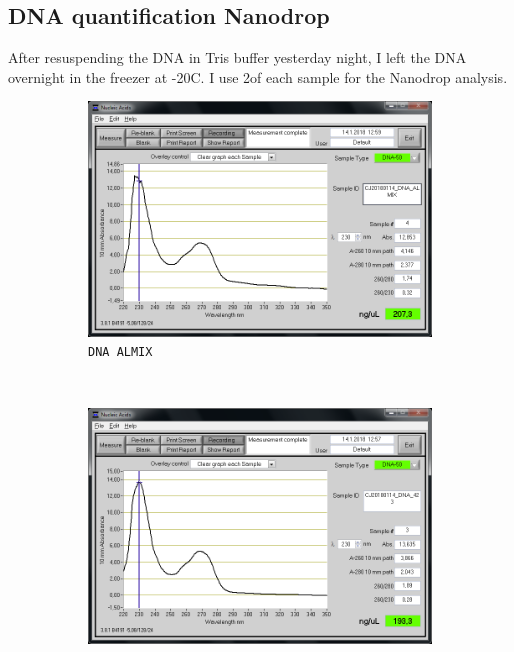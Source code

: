 \subsection{DNA quantification Nanodrop}
\label{task:20180114_cj0}

After resuspending the DNA in Tris buffer yesterday night, I left the DNA overnight in the freezer at -20\degree C. I use 2\uL of each sample for the Nanodrop analysis. 

\begin{figure}[H] %
    \centering
    \caption{Screenshots of the NanoDrop analysis of DNA extracted from bacterial cultures.}
    \label{fig:20180114_nanodrop}
    \begin{subfigure}[b]{0.3\textwidth}
        \includegraphics[width=\textwidth]{graphics/screenshots/CJ20180114_DNA_ALMIX.png}
        \caption{\texttt{DNA ALMIX}}
        \label{sfig:CJ20180114_DNA_ALMIX}
    \end{subfigure}
    ~ 
    \begin{subfigure}[b]{0.3\textwidth}
        \includegraphics[width=\textwidth]{graphics/screenshots/CJ20180114_DNA_423.png}

\end{subfigure}
\end{figure}
